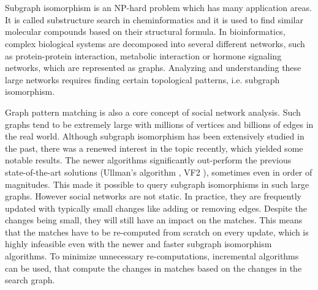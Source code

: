 \chapter{\bevezetes}

Subgraph isomorphism is an NP-hard problem which has many application areas.
It is called substructure search in cheminformatics and it is used to find
similar molecular compounds based on their structural formula. In bioinformatics,
complex biological systems are decomposed into several different networks,
such as protein-protein interaction, metabolic interaction or hormone signaling
networks, which are represented as graphs. Analyzing and understanding these
large networks requires finding certain topological patterns, i.e. subgraph
isomorphism. 

Graph pattern matching is also a core concept of social network analysis.
Such graphs tend to be extremely large with millions of vertices and billions
of edges in the real world. Although subgraph isomorphism has been extensively
studied in the past, there was a renewed interest in the topic recently, which
yielded some notable results. The newer algorithms significantly out-perform
the previous state-of-the-art solutions (Ullman's algorithm \cite{Ullmann1976AnAF} \cite{ullmanimpr}, VF2 \cite{vf2} ), sometimes even 
in order of magnitudes. This made it possible to query subgraph isomorphisms
in such large graphs. However social networks are not static. In practice, they
are frequently updated with typically small changes like adding or removing edges.
Despite the changes being small, they will still have an impact on the matches.
This means that the matches have to be re-computed from scratch on every update,
which is highly infeasible even with the newer and faster subgraph isomorphism
algorithms. To minimize unnecessary re-computations, incremental algorithms
can be used, that compute the changes in matches based on the changes in the
search graph.

